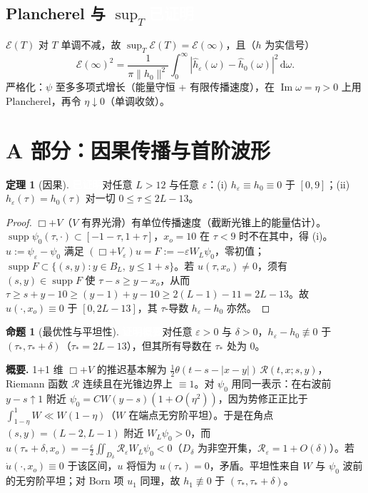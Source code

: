 \documentclass[11pt,a4paper,fontset=windows]{ctexart}
\newcommand{\tagbox}[2]{\begingroup\setlength{\fboxsep}{1.4pt}\colorbox{#1}{\textcolor{white}{\footnotesize\bfseries #2}}\endgroup}
\newcommand{\proven}{\tagbox{green!45!black}{已证明}}
\newcommand{\sketch}{\tagbox{teal!80!black}{证明概要}}
\theoremstyle{definition}
\newtheorem{theorem}{定理}
\newtheorem{proposition}{命题}
\theoremstyle{definition}
\newcommand{\eps}{\varepsilon}
\newcommand{\cE}{\mathcal E}
\newcommand{\cR}{\mathcal R}
\renewcommand{\Im}{\operatorname{Im}}
\DeclareMathOperator{\supp}{supp}
\newcommand{\dd}{\mathrm d}
\newcommand{\tauS}{\tau_*}
\begin{document}
\subsection[\texorpdfstring{Plancherel 与 $\sup_T$}{Plancherel 与 sup over T}]{Plancherel 与 $\sup_T$\enspace\proven}
$\cE(T)$ 对 $T$ 单调不减，故 $\sup_T\cE(T)=\cE(\infty)$，且（$h$ 为实信号）
\[
\cE(\infty)^2=\frac{1}{\pi\|h_0\|^2}\int_0^\infty|\hat h_\eps(\omega)-\hat h_0(\omega)|^2\,\dd\omega .
\]
严格化：$\psi$ 至多多项式增长（能量守恒 + 有限传播速度），在 $\Im\omega=\eta>0$ 上用 Plancherel，再令 $\eta\downarrow0$（单调收敛）。

\section{A 部分：因果传播与首阶波形}
\begin{theorem}[因果]\label{thm:causal}\proven\enspace 对任意 $L>12$ 与任意 $\eps$：(i) $h_\eps\equiv h_0\equiv0$ 于 $[0,9]$；(ii) $h_\eps(\tau)=h_0(\tau)$ 对一切 $0\le\tau\le2L-13$。
\end{theorem}
\begin{proof}
$\Box+V$（$V$ 有界光滑）有单位传播速度（截断光锥上的能量估计）。$\supp\psi_0(\tau,\cdot)\subset[-1-\tau,1+\tau]$，$x_o=10$ 在 $\tau<9$ 时不在其中，得 (i)。$u:=\psi_\eps-\psi_0$ 满足 $(\Box+V_\eps)u=F:=-\eps W_L\psi_0$，零初值；$\supp F\subset\{(s,y):y\in B_L,\ y\le1+s\}$。若 $u(\tau,x_o)\ne0$，须有 $(s,y)\in\supp F$ 使 $\tau-s\ge y-x_o$，从而 $\tau\ge s+y-10\ge(y-1)+y-10\ge2(L-1)-11=2L-13$。故 $u(\cdot,x_o)\equiv0$ 于 $[0,2L-13]$，其 $\tau$-导数 $h_\eps-h_0$ 亦然。
\end{proof}

\begin{proposition}[最优性与平坦性]\label{prop:sharp}\sketch\enspace 对任意 $\eps>0$ 与 $\delta>0$，$h_\eps-h_0\not\equiv0$ 于 $(\tauS,\tauS+\delta)$（$\tauS=2L-13$），但其所有导数在 $\tauS$ 处为 0。
\end{proposition}
\noindent\textbf{概要.} 1+1 维 $\Box+V$ 的推迟基本解为 $\tfrac12\theta(t-s-|x-y|)\,\cR(t,x;s,y)$，Riemann 函数 $\cR$ 连续且在光锥边界上 $\equiv1$。对 $\psi_0$ 用同一表示：在右波前 $y-s\uparrow1$ 附近 $\psi_0=CW(y-s)(1+O(\eta^2))$，因为势修正正比于 $\int_{1-\eta}^1W\ll W(1-\eta)$（$W$ 在端点无穷阶平坦）。于是在角点 $(s,y)=(L-2,L-1)$ 附近 $W_L\psi_0>0$，而 $u(\tauS+\delta,x_o)=-\frac{\eps}{2}\iint_{D_\delta}\cR_\eps W_L\psi_0<0$（$D_\delta$ 为非空开集，$\cR_\eps=1+O(\delta)$）。若 $\dot u(\cdot,x_o)\equiv0$ 于该区间，$u$ 将恒为 $u(\tauS)=0$，矛盾。平坦性来自 $W$ 与 $\psi_0$ 波前的无穷阶平坦；对 Born 项 $u_1$ 同理，故 $h_1\not\equiv0$ 于 $(\tauS,\tauS+\delta)$。
\end{document}
